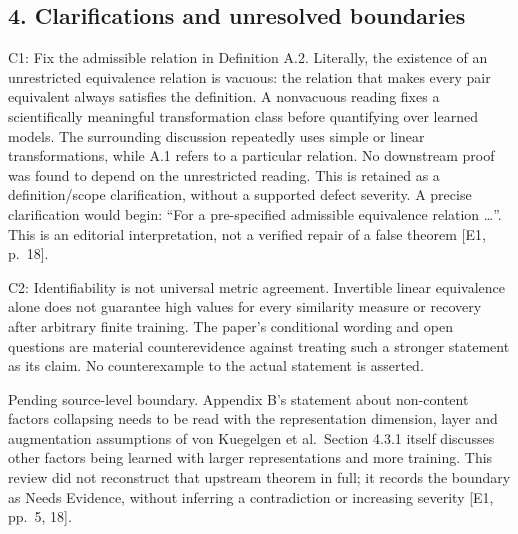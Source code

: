 \documentclass[10pt]{article}
\begin{document}
\subsection*{4. Clarifications and unresolved boundaries}
C1: Fix the admissible relation in Definition A.2. Literally, the existence of an unrestricted equivalence relation is vacuous: the relation that makes every pair equivalent always satisfies the definition. A nonvacuous reading fixes a scientifically meaningful transformation class before quantifying over learned models. The surrounding discussion repeatedly uses simple or linear transformations, while A.1 refers to a particular relation. No downstream proof was found to depend on the unrestricted reading. This is retained as a definition/scope clarification, without a supported defect severity. A precise clarification would begin: “For a pre-specified admissible equivalence relation …”. This is an editorial interpretation, not a verified repair of a false theorem [E1, p. 18].\par
C2: Identifiability is not universal metric agreement. Invertible linear equivalence alone does not guarantee high values for every similarity measure or recovery after arbitrary finite training. The paper’s conditional wording and open questions are material counterevidence against treating such a stronger statement as its claim. No counterexample to the actual statement is asserted.\par
Pending source-level boundary. Appendix B’s statement about non-content factors collapsing needs to be read with the representation dimension, layer and augmentation assumptions of von Kuegelgen et al. Section 4.3.1 itself discusses other factors being learned with larger representations and more training. This review did not reconstruct that upstream theorem in full; it records the boundary as Needs Evidence, without inferring a contradiction or increasing severity [E1, pp. 5, 18].\par
\end{document}
